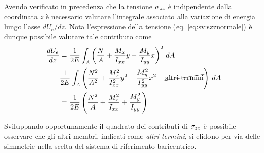 		Avendo verificato in precedenza che la tensione $\sigma_{zz}$ è indipendente dalla coordinata $z$ è necessario valutare l'integrale associato alla variazione di energia lungo l'asse $dU_e/dz$. Nota l'espressione della tensione (eq. \ref{eq:sv:szznormale}) è dunque possibile valutare tale contributo come
		\begin{equation}
		\begin{split}
			\frac{dU_e}{dz} & = \frac 1{2E} \int_A \left(  \frac NA + \frac {M_x} {I_{xx}} y - \frac {M_y} {I_{yy}} x \right)^2\, dA \\
			& \frac 1{2E} \int_A \left(\frac{N^2}{A^2} + \frac{M_x^2}{I_{xx}^2}y^2 + \frac{M_y^2}{I_{yy}^2}x^2 + \cancel{\textrm{altri termini}} \right)\, dA \\
			& = \frac1 {2E} \left( \frac{N^2}A + \frac{M_x^2}{I_{xx}} + \frac {M_y^2}{I_{yy}} \right)
		\end{split}
		\end{equation}
		\begin{nota}
			Sviluppando opportunamente il quadrato dei contributi di $\sigma_{zz}$ è possibile osservare che gli altri membri, indicati come \textit{altri termini}, si elidono per via delle simmetrie nella scelta del sistema di riferimento baricentrico.
		\end{nota}

